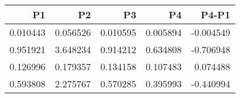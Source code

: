 \begin{tabular}{rrrrr}
\toprule
P1 & P2 & P3 & P4 & P4-P1 \\
\midrule
0.010443 & 0.056526 & 0.010595 & 0.005894 & -0.004549 \\
0.951921 & 3.648234 & 0.914212 & 0.634808 & -0.706948 \\
0.126996 & 0.179357 & 0.134158 & 0.107483 & 0.074488 \\
0.593808 & 2.275767 & 0.570285 & 0.395993 & -0.440994 \\
\bottomrule
\end{tabular}
